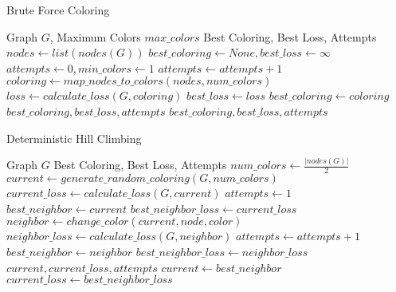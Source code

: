 \documentclass{article}
\begin{document}
\begin{algorithm}
\caption{Brute Force Coloring}
\begin{algorithmic}[1]
\REQUIRE Graph $G$, Maximum Colors $max\_colors$
\ENSURE Best Coloring, Best Loss, Attempts
\STATE $nodes \gets list(nodes(G))$
\STATE $best\_coloring \gets None, best\_loss \gets \infty$
\STATE $attempts \gets 0, min\_colors \gets 1$
        \STATE $attempts \gets attempts + 1$
        \STATE $coloring \gets map\_nodes\_to\_colors(nodes, num\_colors)$
        \STATE $loss \gets calculate\_loss(G, coloring)$
            \STATE $best\_loss \gets loss$
            \STATE $best\_coloring \gets coloring$
                \RETURN $best\_coloring, best\_loss, attempts$
            \ENDIF
        \ENDIF
    \ENDFOR
\ENDFOR
\RETURN $best\_coloring, best\_loss, attempts$
\end{algorithmic}
\end{algorithm}

\begin{algorithm}
\caption{Deterministic Hill Climbing}
\begin{algorithmic}[1]
\REQUIRE Graph $G$
\ENSURE Best Coloring, Best Loss, Attempts
\STATE $num\_colors \gets \frac{|nodes(G)|}{2}$
\STATE $current \gets generate\_random\_coloring(G, num\_colors)$
\STATE $current\_loss \gets calculate\_loss(G, current)$
\STATE $attempts \gets 1$
    \STATE $best\_neighbor \gets current$
    \STATE $best\_neighbor\_loss \gets current\_loss$
            \STATE $neighbor \gets change\_color(current, node, color)$
            \STATE $neighbor\_loss \gets calculate\_loss(G, neighbor)$
            \STATE $attempts \gets attempts + 1$
                \STATE $best\_neighbor \gets neighbor$
                \STATE $best\_neighbor\_loss \gets neighbor\_loss$
            \ENDIF
        \ENDFOR
    \ENDFOR
        \RETURN $current, current\_loss, attempts$
    \ENDIF
    \STATE $current \gets best\_neighbor$
    \STATE $current\_loss \gets best\_neighbor\_loss$
\ENDWHILE
\end{algorithmic}
\end{algorithm}
\end{document}
